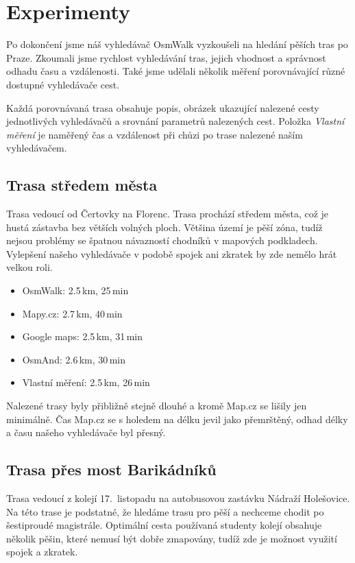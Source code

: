 \chapter{Experimenty}
Po dokončení jsme náš vyhledávač OsmWalk vyzkoušeli na hledání pěších tras po
Praze. Zkoumali jsme rychlost vyhledávání tras, jejich vhodnost a správnost
odhadu času a vzdálenosti. Také jsme udělali několik měření porovnávající různé
dostupné vyhledávače cest.

Každá porovnávaná trasa obsahuje popis, obrázek ukazující nalezené cesty
jednotlivých vyhledávačů a srovnání parametrů nalezených cest. Položka {\it
Vlastní měření} je naměřený čas a vzdálenost při chůzi po trase nalezené naším
vyhledávačem. 

\section{Trasa středem města}
Trasa vedoucí od Čertovky na Florenc. Trasa prochází středem města, což je hustá
zástavba bez větších volných ploch. Většina území je pěší zóna, tudíž nejsou
problémy se špatnou návazností chodníků v mapových podkladech. Vylepšení našeho
vyhledávače v podobě spojek ani zkratek by zde nemělo hrát velkou roli.
\begin{itemize}
	\item OsmWalk: 2.5\,km, 25\,min
	\item Mapy.cz: 2.7\,km, 40\,min
	\item Google maps: 2.5\,km, 31\,min
	\item OsmAnd: 2.6\,km, 30\,min
	\item Vlastní měření: 2.5\,km, 26\,min
\end{itemize}
Nalezené trasy byly přibližně stejně dlouhé a kromě Map.cz se lišily jen
minimálně. Čas Map.cz se s holedem na délku jevil jako přemrštěný, odhad délky a
času našeho vyhledávače byl přesný. 


\section{Trasa přes most Barikádníků}
Trasa vedoucí z kolejí 17.~listopadu na autobusovou zastávku Nádraží Holešovice.
Na této trase je podstatné, že hledáme trasu pro pěší a nechceme chodit po
šestiproudé magistrále. Optimální cesta používaná studenty kolejí obsahuje
několik pěšin, které nemusí být dobře zmapovány, tudíž zde je možnost využití
spojek a zkratek.

